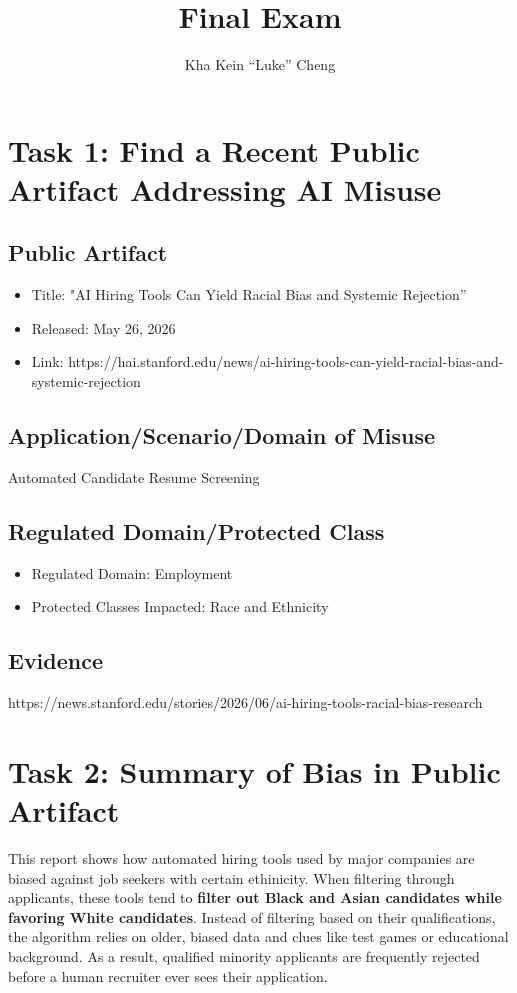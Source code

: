 \documentclass[
	letterpaper, %
]{jdf}
\author{Kha Kein “Luke” Cheng}
\title{Final Exam}
\begin{document}

\maketitle

\section{Task 1: Find a Recent Public Artifact Addressing AI Misuse }
\subsection{Public Artifact}
\begin{itemize}
    \item Title: "AI Hiring Tools Can Yield Racial Bias and Systemic Rejection”
    \item Released: May 26, 2026 
    \item Link: https://hai.stanford.edu/news/ai-hiring-tools-can-yield-racial-bias-and-systemic-rejection
\end{itemize}

\subsection{Application/Scenario/Domain of Misuse}
Automated Candidate Resume Screening

\subsection{Regulated Domain/Protected Class}
\begin{itemize}
    \item Regulated Domain: Employment
    \item Protected Classes Impacted: Race and Ethnicity
\end{itemize}

\subsection{Evidence}
https://news.stanford.edu/stories/2026/06/ai-hiring-tools-racial-bias-research


\section{Task 2: Summary of Bias in Public Artifact}
This report shows how automated hiring tools used by major companies are biased against job seekers with certain ethinicity. When filtering through applicants, these tools tend to \textbf{filter out Black and Asian candidates while favoring White candidates}. Instead of filtering based on their qualifications, the algorithm relies on older, biased data and clues like test games or educational background. As a result, qualified minority applicants are frequently rejected before a human recruiter ever sees their application.
\end{document}
